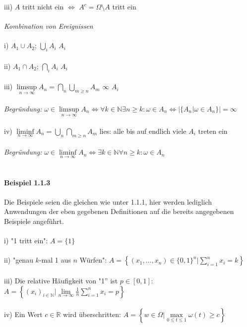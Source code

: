 \documentclass[10pt,a4paper]{report}
\numberwithin{equation}{section}
\numberwithin{figure}{section}
\theoremstyle{plain}
\theoremstyle{definition}
\theoremstyle{plain}
\theoremstyle{definition}
\theoremstyle{remark}
\theoremstyle{plain}
\theoremstyle{plain}
\theoremstyle{plain}
\newcommand{\1}{ \mathbb{1} } %
\begin{document}
iii) $A$ tritt nicht ein $\Leftrightarrow$ $A^c=\Omega\setminus A$ tritt ein \\\\
\textit{Kombination von Ereignissen}\\\\
i) $A_1 \cup A_2$; $\bigcup\limits_i A_i$\qquad {} $A_i$ \\\\
ii) $A_1 \cap A_2$; $\bigcap\limits_i A_i$\qquad {} $A_i$ \\\\
iii) $\limsup\limits_{n \to \infty} A_n=\bigcap\limits_{n}\bigcup\limits_{m\geq n}A_m$\qquad {} $\infty$ $A_i$  \\\\
\textit{Begründung:} $\omega \in \limsup\limits_{n \to \infty} A_n \Leftrightarrow \forall k \in \mathbb{N} \exists n\geq k: \omega \in A_n \Leftrightarrow |\{A_n|\omega \in A_n\}|=\infty$\\\\
iv) $\liminf\limits_{n \to \infty} A_n=\bigcup\limits_{n}\bigcap\limits_{m\geq n}A_m$ \qquad lies: alle bis auf endlich viele $A_i$ treten ein\\\\
\textit{Begründung:} $\omega \in \liminf\limits_{n \to \infty} A_n \Leftrightarrow \exists k \in \mathbb{N} \forall n\geq k: \omega \in A_n$\\\\\\
\textbf{Beispiel 1.1.3}\\\\
Die Beispiele seien die gleichen wie unter 1.1.1, hier werden lediglich Anwendungen der eben gegebenen Definitionen auf die bereits angegebenen Beispiele angeführt.\\\\
i) "1 tritt ein": $A=\{1\}$ \\\\
ii) "genau $k$-mal 1 aus $n$ Würfen": $A=\left\{(x_1,\dots,x_n) \in \{0,1\}^n| \sum\limits_{i=1}^nx_i=k\right\}$\\\\
iii) Die relative Häufigkeit von "1'' ist $p \in [0,1]$: $A=\left\{(x_i)_{i \in \mathbb{N}}|\lim\limits_{n \to \infty}\frac{1}{n}\sum\limits_{i=1}^n x_i=p\right\}$\\\\
iv) Ein Wert $c \in \mathbb{R}$ wird überschritten: $A=\left\{w \in \Omega| \max\limits_{0\leq t\leq 1}\omega(t)\geq c \right\}$  \\\\\\
\end{document}
